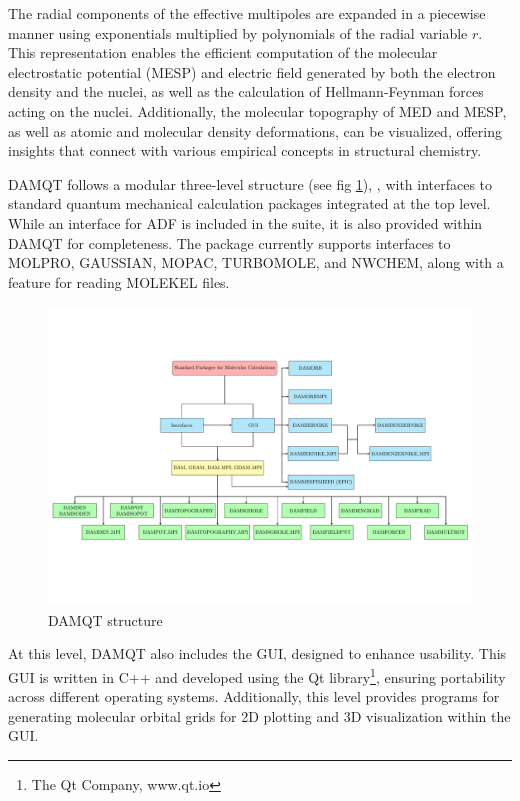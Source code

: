 \documentclass[10pt]{article}
\begin{document}
The radial components of the effective multipoles are expanded in a piecewise manner using exponentials multiplied by polynomials of the radial variable $r$. This representation enables the efficient computation of the molecular electrostatic potential (MESP) and electric field generated by both the electron density and the nuclei, as well as the calculation of Hellmann-Feynman forces acting on the nuclei. Additionally, the molecular topography of MED and MESP, as well as atomic and molecular density deformations, can be visualized, offering insights that connect with various empirical concepts in structural chemistry.

DAMQT follows a modular three-level structure (see fig \ref{fig:1}), , with interfaces to standard quantum mechanical calculation packages integrated at the top level. While an interface for ADF is included in the suite, it is also provided within DAMQT for completeness. The package currently supports interfaces to MOLPRO, GAUSSIAN, MOPAC, TURBOMOLE, and NWCHEM, along with a feature for reading MOLEKEL \mkl{ } files.

\begin{figure}[H]
\vspace*{-2cm}
\begin{center}
\includegraphics[width=1\linewidth]{DAMQT_structure.pdf}
\end{center}
\vspace*{-2.5cm}
\caption{DAMQT structure \label{fig:1}}
\end{figure}

At this level, DAMQT also includes the GUI, designed to enhance usability.
This GUI is written in C++ and developed using the Qt library\footnote{The Qt Company, www.qt.io}, ensuring portability across different operating systems. Additionally, this level provides programs for generating molecular orbital grids for 2D plotting and 3D visualization within the GUI.
\end{document}
